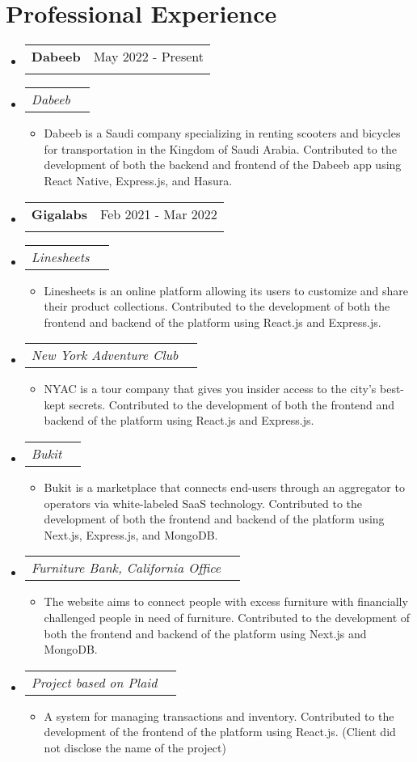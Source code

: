 \documentclass[letterpaper,11pt]{article}
\makeatletter
\newcommand{\resumeItem}[1]{
  \item\small{
    {#1 \vspace{-2pt}}
  }
}
\newcommand{\resumeSubheading}[4]{
  \vspace{-1pt}\item
    \begin{tabular*}{0.97\textwidth}[t]{l@{\extracolsep{\fill}}r}
      \textbf{#1} & #2 \\
      \textit{\small#3} & \textit{\small #4} \\
    \end{tabular*}\vspace{-6pt}
}
\newcommand{\resumeSubSubheading}[2]{
    \item
    \begin{tabular*}{0.97\textwidth}{l@{\extracolsep{\fill}}r}
      \textit{\small#1} & \textit{\small #2} \\
    \end{tabular*}\vspace{-6pt}
}
\newcommand{\resumeProjectHeading}[2]{
    \item
    \begin{tabular*}{0.97\textwidth}{l@{\extracolsep{\fill}}r}
      \small#1 & #2 \\
    \end{tabular*}\vspace{-5pt}
}
\newcommand{\resumeSubHeadingListStart}{\begin{itemize}[leftmargin=0.15in, label={}]}
\newcommand{\resumeSubHeadingListEnd}{\end{itemize}}
\newcommand{\resumeItemListStart}{\begin{itemize}}
\newcommand{\resumeItemListEnd}{\end{itemize}\vspace{-4pt}}
\makeatother
\begin{document}
\section{Professional Experience}
  \resumeSubHeadingListStart
  \resumeSubheading
      {Dabeeb}{May 2022 - Present}{}{}\vspace{-12pt}
      \resumeSubSubheading{Dabeeb}{}
      \resumeItemListStart
        \resumeItem{Dabeeb is a Saudi company specializing in renting scooters and bicycles for transportation in the Kingdom of Saudi Arabia. Contributed to the development of both the backend and frontend of the Dabeeb app using React Native, Express.js, and Hasura.}
    \resumeItemListEnd
    \resumeSubheading
      {Gigalabs}{Feb 2021 - Mar 2022}{}{}\vspace{-12pt}
      \resumeSubSubheading{Linesheets}{}
      \resumeItemListStart
        \resumeItem{Linesheets is an online platform allowing its users to customize and share their product collections. Contributed to the development of both the frontend and backend of the platform using React.js and Express.js.}
    \resumeItemListEnd
    \resumeSubSubheading{New York Adventure Club}{}
      \resumeItemListStart
        \resumeItem{NYAC is a tour company that gives you insider access to the city’s best-kept secrets. Contributed to the development of both the frontend and backend of the platform using React.js and Express.js.}
    \resumeItemListEnd
    \resumeSubSubheading{Bukit}{}
      \resumeItemListStart
        \resumeItem{Bukit is a marketplace that connects end-users through an aggregator to operators via white-labeled SaaS technology. Contributed to the development of both the frontend and backend of the platform using Next.js, Express.js, and MongoDB.}
    \resumeItemListEnd
    \resumeSubSubheading{Furniture Bank, California Office}{}
      \resumeItemListStart
        \resumeItem{The website aims to connect people with excess furniture with financially challenged people in need of furniture. Contributed to the development of both the frontend and backend of the platform using Next.js and MongoDB.}
    \resumeItemListEnd
      \resumeSubSubheading{Project based on Plaid}{}
      \resumeItemListStart
        \resumeItem{A system for managing transactions and inventory. Contributed to the development of the frontend of the platform using React.js. (Client did not disclose the name of the project)}
    \resumeItemListEnd
  \resumeSubHeadingListEnd


\end{document}
